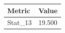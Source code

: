 \begin{tabular}{ll}
\toprule
Metric & Value \\
\midrule
Stat\_13 & 19.500 \\
\bottomrule
\end{tabular}